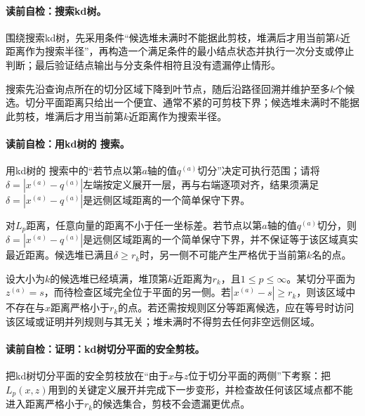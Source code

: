 \paragraph{读前自检：搜索kd树。}围绕搜索kd树，先采用条件“候选堆未满时不能据此剪枝，堆满后才用当前第$k$近距离作为搜索半径”，再构造一个满足条件的最小结点状态并执行一次分支或停止判断；最后验证结点输出与分支条件相符且没有遗漏停止情形。\par

搜索先沿查询点所在的切分区域下降到叶节点，随后沿路径回溯并维护至多$k$个候选。切分平面距离只给出一个便宜、通常不紧的可剪枝下界；候选堆未满时不能据此剪枝，堆满后才用当前第$k$近距离作为搜索半径。

\paragraph{读前自检：用kd树的 搜索。}用kd树的 搜索中的“若节点以第$a$轴的值$q^{(a)}$切分”决定可执行范围；请将$\delta=|x^{(a)}-q^{(a)}|$左端按定义展开一层，再与右端逐项对齐，结果须满足$\delta=|x^{(a)}-q^{(a)}|$是远侧区域距离的一个简单保守下界。\par

对$L_p$距离，任意向量的距离不小于任一坐标差。若节点以第$a$轴的值$q^{(a)}$切分，则$\delta=|x^{(a)}-q^{(a)}|$是远侧区域距离的一个简单保守下界，并不保证等于该区域真实最近距离。候选堆已满且$\delta\ge r_k$时，另一侧不可能产生严格优于当前第$k$名的点。

\begin{lemma}[kd树切分平面的安全剪枝]\label{lem:V2-C02-kd-prune}
设大小为$k$的候选堆已经填满，堆顶第$k$近距离为$r_k$，且$1\le p\le\infty$。某切分平面为$z^{(a)}=s$，而待检查区域完全位于平面的另一侧。若$|x^{(a)}-s|\ge r_k$，则该区域中不存在与$x$距离严格小于$r_k$的点。若还需按规则区分等距离候选，应在等号时访问该区域或证明并列规则与其无关；堆未满时不得剪去任何非空远侧区域。
\end{lemma}
\paragraph{读前自检：证明：kd树切分平面的安全剪枝。}把kd树切分平面的安全剪枝放在“由于$x$与$z$位于切分平面的两侧”下考察：把$L_p(x,z)$用到的关键定义展开并完成下一步变形，并检查故任何该区域点都不能进入距离严格小于$r_k$的候选集合，剪枝不会遗漏更优点。\par

